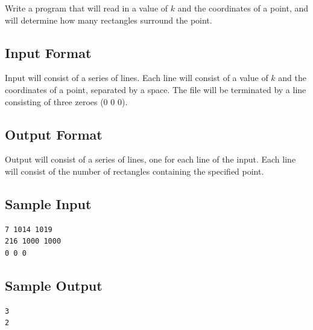 \documentclass[12pt]{article}
\begin{document}
Write a program that will read in a value of $k$ and the coordinates of a point, and will determine how many rectangles surround the point.


\subsection*{Input Format}

Input will consist of a series of lines. Each line will consist of a value of $k$ and the coordinates of a point, separated by a space. The file will be terminated by a line consisting of three zeroes (0 0 0).

\subsection*{Output Format}

Output will consist of a series of lines, one for each line of the input. Each line will consist of the number of rectangles containing the specified point.

\subsection*{Sample Input}
\begin{verbatim}
7 1014 1019
216 1000 1000
0 0 0
\end{verbatim}

\subsection*{Sample Output}
\begin{verbatim}
3
2
\end{verbatim}
\end{document}

